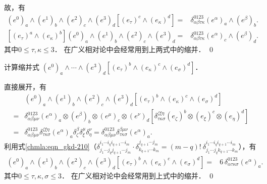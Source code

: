 故，有
\begin{align}
	(e^{0})_{a} \wedge (e^{1})_{b} \wedge (e^{2})_{c} \wedge (e^{3})_{d} 
	\left[(e_\tau)^{c}\wedge(e_\kappa)^{d}\right] 
	=& \delta^{0123}_{\alpha\beta\tau\kappa} (e^{\alpha})_{a} \wedge (e^{\beta})_{b}  . \\
	\left[(e_\tau)^{a}\wedge(e_\kappa)^{b}\right] 
	(e^{0})_{a} \wedge (e^{1})_{b} \wedge (e^{2})_{c} \wedge (e^{3})_{d} 
	=& \delta^{0123}_{\alpha\beta\tau\kappa} (e^{\alpha})_{c} \wedge (e^{\beta})_{d}  .
\end{align}
其中$0\leqslant \tau,\kappa \leqslant 3$．
在广义相对论中会经常用到上两式中的缩并．
\qed



\begin{example}\label{chdf:exam_eiapklp}
	计算缩并式
	$(e^{0})_{a} \wedge \cdots \wedge (e^{3})_{d} \left[(e_\tau)^{b}
	\wedge(e_\kappa)^{c}\wedge(e_\sigma)^{d}\right]$．
\end{example}
直接展开，有
\begin{align*}
	&(e^{0})_{a} \wedge (e^{1})_{b} \wedge (e^{2})_{c} \wedge (e^{3})_{d} 
	\left[(e_\tau)^{b}\wedge(e_\kappa)^{c}\wedge(e_\sigma)^{d}\right] \\
	=& \delta^{0123}_{\alpha\beta\mu\nu} 
	(e^{\alpha})_{a} \otimes (e^{\beta})_{b} \otimes (e^{\mu})_{c} \otimes (e^{\nu})_{d} 
	\left[\delta^{\zeta\xi\eta}_{\tau\kappa\sigma}  
	(e_\zeta)^{b}\otimes(e_\xi)^{c}\otimes(e_\eta)^{d} \right] \\
	=&\delta^{0123}_{\alpha\beta\mu\nu} \delta^{\zeta\xi\eta}_{\tau\kappa\sigma}
	(e^{\alpha})_{a}  \delta^\beta_\zeta \delta^\mu_\xi \delta^\nu_\eta 
	=\delta^{0123}_{\alpha\beta\mu\nu} \delta^{\beta\mu\nu}_{\tau\kappa\sigma}(e^{\alpha})_{a} .
\end{align*}
利用式\eqref{chmla:eqn_gkd-210}（$\delta_{j_1 \cdots j_q j_{q+1}\cdots j_m}^{i_1 \cdots i_q i_{q+1}\cdots i_m}
\cdot \delta_{k_{q+1} \cdots k_m}^{j_{q+1} \cdots j_m}
=(m-q)! \ \delta_{j_1 \cdots j_q k_{q+1}\cdots k_m}^{i_1 \cdots i_q i_{q+1}\cdots i_m} $），有
\begin{align}
	(e^{0})_{a} \wedge (e^{1})_{b} \wedge (e^{2})_{c} \wedge (e^{3})_{d} 
	\left[(e_\tau)^{b}\wedge(e_\kappa)^{c}\wedge(e_\sigma)^{d}\right] 
	=& 6 \, \delta^{0123}_{\alpha\tau\kappa\sigma} (e^{\alpha})_{a}  . 
\end{align}
其中$0\leqslant \tau,\kappa,\sigma \leqslant 3$．
在广义相对论中会经常用到上式中的缩并．
\qed




